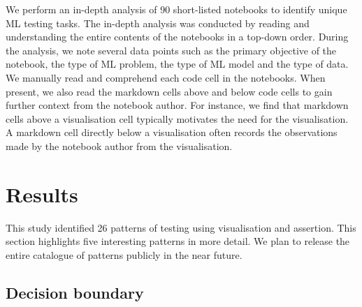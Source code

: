 \documentclass[conference]{IEEEtran}
\begin{document}
We perform an in-depth analysis of 90 short-listed notebooks to
identify unique ML testing tasks. The in-depth analysis was conducted
by reading and understanding the entire contents of the notebooks in
a top-down order. During the analysis, we note several data points
such as the primary objective of the notebook, the type of ML problem,
the type of ML model and the type of data. We manually read and
comprehend each code cell in the notebooks. When present, we also read
the markdown cells above and below code cells to gain further context
from the notebook author. For instance, we find that markdown cells
above a visualisation cell typically motivates the need for the
visualisation. A markdown cell directly below a visualisation often
records the observations made by the notebook author from the
visualisation.

\section{Results}\label{sec:result}




This study identified 26 patterns of testing using visualisation and
assertion. This section highlights five interesting patterns in more
detail. We plan to release the entire catalogue of patterns publicly
in the near future.


\subsection{Decision boundary}\label{sec:svm}





\end{document}
